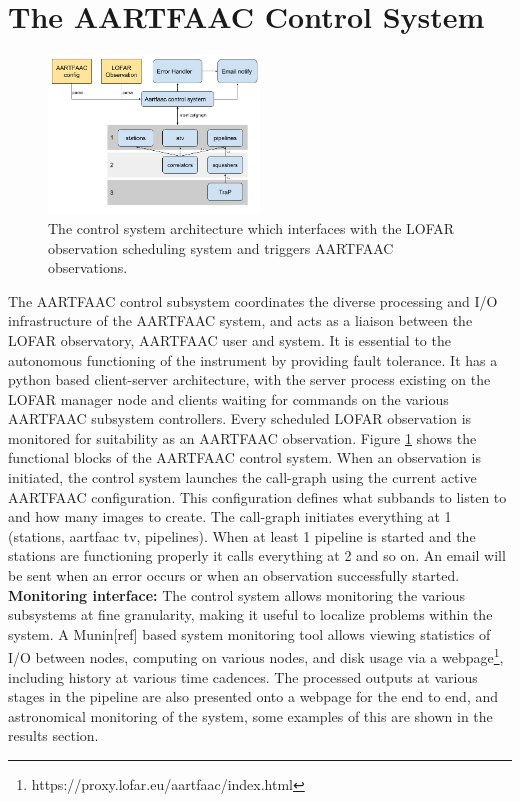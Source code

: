 \documentclass{ws-jai}
\begin{document}
\section {\label{sec:acontrol} The AARTFAAC Control System}
\begin{figure}[htbp]
\centering
\includegraphics[width=0.50\textwidth]{Figs/acs.png}
\caption{The  control  system  architecture  which  interfaces  with  the  LOFAR
  observation scheduling system and triggers AARTFAAC observations.}
\label{fig:afaac_ctrl_sys}
\end{figure}
The  AARTFAAC  control subsystem  coordinates  the  diverse processing  and  I/O
infrastructure of the  AARTFAAC system, and acts as a  liaison between the LOFAR
observatory,  AARTFAAC user  and  system.   It is  essential  to the  autonomous
functioning of  the instrument by  providing fault  tolerance.  It has  a python
based client-server architecture, with the  server process existing on the LOFAR
manager node and clients waiting for  commands on the various AARTFAAC subsystem
controllers. Every scheduled  LOFAR observation is monitored  for suitability as
an AARTFAAC  observation. Figure  \ref{fig:afaac_ctrl_sys} shows  the functional
blocks of  the AARTFAAC control system.   When an observation is  initiated, the
control  system  launches  the  call-graph using  the  current  active  AARTFAAC
configuration. This  configuration defines  what subbands to  listen to  and how
many  images to  create.  The  call-graph initiates  everything at  1 (stations,
aartfaac tv,  pipelines). When at least  1 pipeline is started  and the stations
are functioning properly  it calls everything at  2 and so on. An  email will be
sent when an error occurs or when an observation successfully started.\\

\noindent \textbf  {Monitoring interface:} The control  system allows monitoring
the  various  subsystems at  fine  granularity,  making  it useful  to  localize
problems within  the system.  A  Munin[ref] based system monitoring  tool allows
viewing statistics  of I/O between nodes,  computing on various nodes,  and disk
usage   via    a   webpage\footnote{https://proxy.lofar.eu/aartfaac/index.html},
including history  at various time  cadences.  The processed outputs  at various
stages in the pipeline are also presented onto a webpage for the end to end, and
astronomical monitoring  of the system, some  examples of this are  shown in the
results section.
\end{document}
